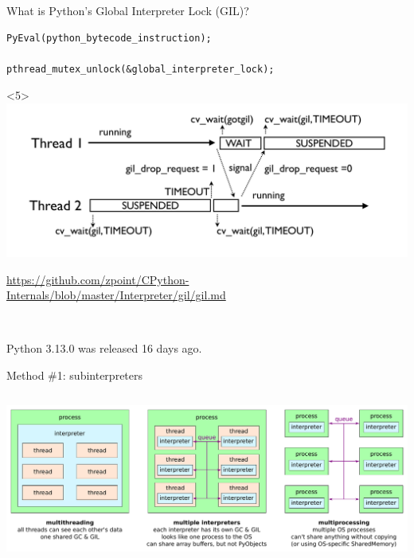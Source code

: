 \documentclass[aspectratio=169]{beamer}
\begin{document}
\begin{frame}[fragile]{What is Python's Global Interpreter Lock (GIL)?}
\begin{onlyenv}
\begin{verbatim}
PyEval(python_bytecode_instruction);

pthread_mutex_unlock(&global_interpreter_lock);
\end{verbatim}
\end{onlyenv}\begin{onlyenv}<5>
\includegraphics[width=\linewidth]{img/new_gil.png}

\normalsize
\textcolor{blue}{\url{https://github.com/zpoint/CPython-Internals/blob/master/Interpreter/gil/gil.md}}
\end{onlyenv}
\end{frame}

\begin{frame}{\mbox{ }}
\Large
\vspace{0.5 cm}
\begin{center}
Python 3.13.0 was released 16 days ago.

\vspace{1 cm}
\end{center}
\end{frame}

\begin{frame}{Method \#1: subinterpreters}
\large
\vspace{0.5 cm}
\begin{columns}
\includegraphics[width=\linewidth]{img/thread-interpreter-process.pdf}
\end{columns}

\vspace{0.5 cm}
\end{frame}
\end{document}
